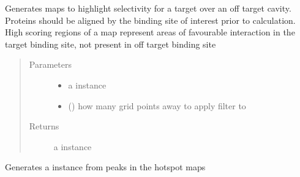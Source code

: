 \documentclass[letterpaper,10pt,english]{sphinxmanual}
\begin{document}
\begin{fulllineitems}
\begin{fulllineitems}
\end{fulllineitems}


\begin{fulllineitems}
\label{\detokenize{result_api:hotspots.result.Results.get_difference_map}}

Generates maps to highlight selectivity for a target over an off target cavity. Proteins should be aligned
by the binding site of interest prior to calculation.
High scoring regions of a map represent areas of favourable interaction in the target binding site, not
present in off target binding site
\begin{quote}\begin{description}
\item[{Parameters}] \leavevmode\begin{itemize}
\item {} 
 \textendash{} a {\hyperref[\detokenize{result_api:hotspots.result.Results}]{}} instance

\item {} 
 () \textendash{} how many grid points away to apply filter to

\end{itemize}

\item[{Returns}] \leavevmode
a {\hyperref[\detokenize{result_api:hotspots.result.Results}]{}} instance

\end{description}\end{quote}

\end{fulllineitems}


\begin{fulllineitems}
\label{\detokenize{result_api:hotspots.result.Results.get_pharmacophore_model}}
Generates a  instance from peaks in the hotspot maps


\end{fulllineitems}
\end{fulllineitems}
\end{document}
